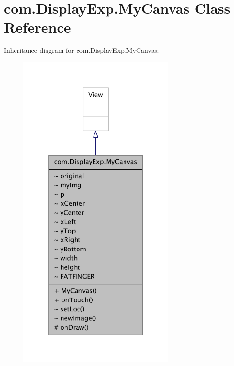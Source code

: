 \hypertarget{classcom_1_1_display_exp_1_1_my_canvas}{\section{com.\-Display\-Exp.\-My\-Canvas Class Reference}
\label{classcom_1_1_display_exp_1_1_my_canvas}
}


Inheritance diagram for com.\-Display\-Exp.\-My\-Canvas\-:
\nopagebreak
\begin{figure}[H]
\begin{center}
\leavevmode
\includegraphics[width=224pt]{classcom_1_1_display_exp_1_1_my_canvas__inherit__graph}
\end{center}
\end{figure}


